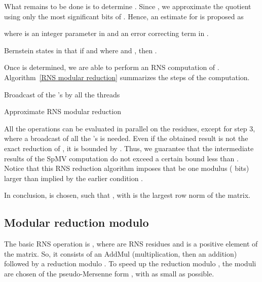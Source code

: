 \documentclass[runningheads,orivec]{llncs}
\begin{document}
What remains to be done is to determine .
Since , we approximate the quotient  using only the  most significant bits of . Hence, an estimate for  is proposed as


where  is an integer parameter in  and  an error correcting term in . 

Bernstein states in \cite{BERN95} that if  and  where  and , then .  

Once  is determined, we are able to perform an RNS computation of . Algorithm~\ref{RNS modular reduction} summarizes the steps of the computation. 
  
\begin{algorithm}[H]
  \LinesNumbered
  \SetAlgoLined
  \DontPrintSemicolon 
  Broadcast of the 's by all the threads\\
  \caption{Approximate RNS modular reduction}
  \label{RNS modular reduction}
\end{algorithm}



All the operations can be evaluated in parallel on the residues, except for step 3, where a broadcast of all the 's is needed. Even if the obtained result  is not the exact reduction of , it is bounded by . Thus, we guarantee that the intermediate results of the SpMV computation do not exceed a certain bound less than . Notice that this RNS reduction algorithm imposes that  be one modulus ( bits) larger than implied by the earlier condition .

In conclusion,  is chosen, such that , with  is the largest row norm of the matrix.


\vspace*{-0.25cm}

\subsection{Modular reduction modulo }
\vspace*{-0.25cm}

The basic RNS operation is , where  are RNS residues and  is a positive element of the matrix. So, it consists of an AddMul (multiplication, then an addition) followed by a reduction modulo . To speed up the reduction modulo , the moduli are chosen of the pseudo-Mersenne form , with  as small as possible. 
\end{document}
